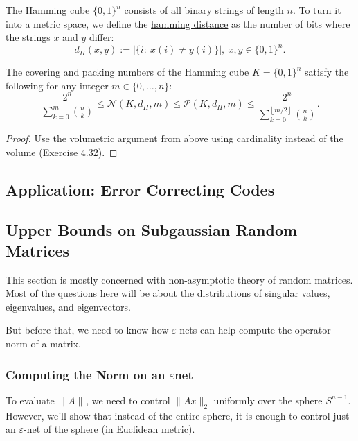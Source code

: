 \begin{definition}[]
\label{def:4.2.14} 
The Hamming cube $\{0, 1\}^n$ consists of all binary strings of length $n$. To turn it into a metric space, 
we define the \underline{hamming distance} as the number of bits where the strings $x$ and $y$ differ:
\[ d_H(x, y) := |\{i: \ x(i) \neq y(i) \}|, \ x, y \in \{0, 1\}^n. \]
\end{definition}

\begin{proposition}
The covering and packing numbers of the Hamming cube $K = \{0, 1\}^n$ satisfy the following for any integer 
$m \in \{0, \dots, n\}$: 
\[ \frac{2^n}{\sum_{k = 0}^{m} \binom{n}{k}} \leq \mathcal{N}(K, d_H, m) 
\leq \mathcal{P}(K, d_H, m) \leq \frac{2^n}{\sum_{k = 0}^{\left\lfloor m/2 \right\rfloor} \binom{n}{k}}. \]
\end{proposition}

\begin{proof}
Use the volumetric argument from above using cardinality instead of the volume (Exercise 4.32).
\end{proof}



\subsection{Application: Error Correcting Codes}



\subsection{Upper Bounds on Subgaussian Random Matrices}
This section is mostly concerned with non-asymptotic theory of random matrices. Most of the questions here 
will be about the distributions of singular values, eigenvalues, and eigenvectors.

But before that, we need to know how $\varepsilon$-nets can help compute the operator norm of a matrix.

\subsubsection{Computing the Norm on an \texorpdfstring{$\varepsilon$} -net}
To evaluate $\lVert A \rVert_{}$, we need to control $\lVert Ax \rVert_{2}$ uniformly over the sphere 
$S^{n - 1}$. However, we'll show that instead of the entire sphere, it is enough to control just an 
$\varepsilon$-net of the sphere (in Euclidean metric).

